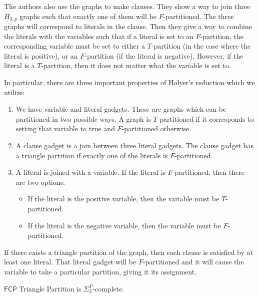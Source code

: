 \documentclass[runningheads,a4paper]{llncs}
\begin{document}
The authors also use the graphs to make clauses. They show a way to join three $H_{3,p}$ graphs such that exactly one of them will be $F$-partitioned. The three graphs will correspond to literals in the clause. Then they give a way to combine the literals with the variables such that if a literal is set to an $F$-partition, the corresponding variable must be set to either a $T$-partition (in the case where the literal is positive), or an $F$-partition (if the literal is negative). However, if the literal is a $T$-partition, then it does not matter what the variable is set to. 

In particular, there are three important properties of Holyer's reduction which we utilize:
\begin{enumerate}
\item We have variable and literal gadgets. These are graphs which can be partitioned in two possible ways. A graph is $T$-partitioned if it corresponds to setting that variable to true and $F$-partitioned otherwise.  
\item A clause gadget is a join between three literal gadgets. The clause gadget has a triangle partition if exactly one of the literals is $F$-partitioned.
\item A literal is joined with a variable. If the literal is $F$-partitioned, then there are two options:
\begin{itemize}
\item If the literal is the positive variable, then the variable must be $T$-partitioned.
\item If the literal is the negative variable, then the variable must be $F$-partitioned.
\end{itemize}
\end{enumerate}

If there exists a triangle partition of the graph, then each clause is satisfied by at least one literal. That literal gadget will be $F$-partitioned and it will cause the variable to take a particular partition, giving it its assignment. 

\begin{theorem}
$\mathsf{FCP}$ Triangle Partition is $\Sigma_2^P$-complete.
\end{theorem}
\end{document}
